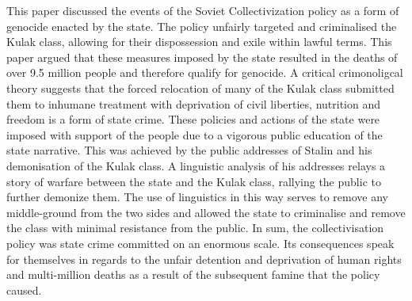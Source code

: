 \documentclass[11pt, a4paper,]{scrartcl}
\begin{document}
This paper discussed the events of the Soviet Collectivization policy as a form of genocide enacted by the state. The policy unfairly targeted and criminalised the Kulak class, allowing for their dispossession and exile within lawful terms.  This paper argued that these measures imposed by the state resulted in the deaths of over 9.5 million people and therefore qualify for genocide. A critical crimonoligcal theory suggests that the forced relocation of many of the Kulak class submitted them to inhumane treatment with deprivation of civil liberties, nutrition and freedom is a form of state crime. These policies and actions of the state were imposed with support of the people due to a vigorous public education of the state narrative. This was achieved by the public addresses of Stalin and his demonisation of the Kulak class. A linguistic analysis of his addresses relays a story of warfare between the state and the Kulak class, rallying the public to further demonize them. The use of linguistics in this way serves to remove any middle-ground from the two sides and allowed the state to criminalise and remove the class with minimal resistance from the public. In sum, the collectivisation policy was state crime committed on an enormous scale. Its consequences speak for themselves in regards to the unfair detention and deprivation of human rights and multi-million deaths as a result of the subsequent famine that the policy caused.


\newpage



%


\end{document}

